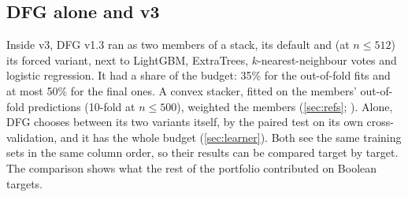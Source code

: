 \begin{table}[t]
\centering{\footnotesize\setlength{\tabcolsep}{3pt}
}
\caption{Every target on which DFG alone is not clearly better than  (9 of the 126 with network runs), and the one other target it never learns ( has no network runs) . $\nstar$ as in \cref{tab:dlheld7}. In brackets, the variant attaining : wd, cewd and cewd1.0 stand for ,  and . Random formulas are named by their size; their gates are in . Source:  (\texttt{q2\_suites}, \texttt{q3\_lowdeg}) via .}
\label{tab:notwins}
\end{table}

\subsection{DFG alone and v3}\label{app:v3}

Inside v3, DFG v1.3 ran as two members of a stack, its default and (at $n\le512$) its forced variant, next to LightGBM, ExtraTrees, $k$-nearest-neighbour votes and logistic regression. It had a share of the budget: 35\% for the out-of-fold fits and at most 50\% for the final ones. A convex stacker, fitted on the members' out-of-fold predictions (10-fold at $n\le500$), weighted the members (\cref{sec:refs}; ). Alone, DFG chooses between its two variants itself, by the paired test on its own cross-validation, and it has the whole budget (\cref{sec:learner}). Both see the same training sets in the same column order, so their results can be compared target by target. The comparison shows what the rest of the portfolio contributed on Boolean targets.


